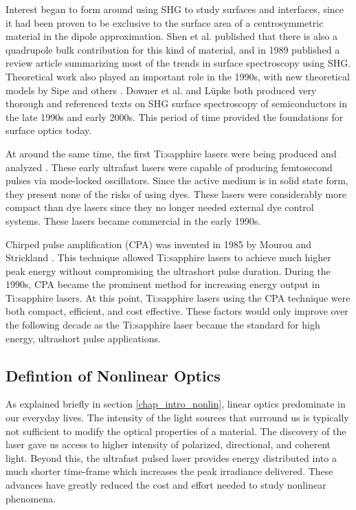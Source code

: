 \documentclass[10pt]{article}
\begin{document}
Interest began to form around using SHG to study surfaces and interfaces, since it had been proven \cite{PhysRevLett.46.145} to be exclusive to the surface area of a centrosymmetric material in the dipole approximation. Shen et al. published \cite{PhysRevB.38.7985} that there is also a quadrupole bulk contribution for this kind of material, and in 1989 \cite{shen89nature} published a review article summarizing most of the trends in surface spectroscopy using SHG. Theoretical work also played an important role in the 1990s, with new theoretical models by Sipe \cite{PhysRevB.53.10751} and others \cite{PhysRevB.53.4999, PhysRevB.60.14334, PhysRevB.55.2489, PhysRevB.57.2569}. Downer et al. \cite{downer2001optical} and L\"upke \cite{Lupke199975} both produced very thorough and referenced texts on SHG surface spectroscopy of semiconductors in the late 1990s and early 2000s. This period of time provided the foundations for surface optics today.

At around the same time, the first Ti:sapphire lasers were being produced and analyzed \cite{Moulton:86}. These early ultrafast lasers were capable of producing femtosecond pulses via mode-locked oscillators. Since the active medium is in solid state form, they present none of the risks of using dyes. These lasers were considerably more compact than dye lasers since they no longer needed external dye control systems. These lasers became commercial in the early 1990s.

Chirped pulse amplification (CPA) was invented in 1985 by Mourou and Strickland \cite{Strickland1985447}. This technique allowed Ti:sapphire lasers to achieve much higher peak energy without compromising the ultrashort pulse duration. During the 1990s, CPA became the prominent method for increasing energy output in Ti:sapphire lasers. At this point, Ti:sapphire lasers using the CPA technique were both compact, efficient, and cost effective. These factors would only improve over the following decade as the Ti:sapphire laser became the standard for high energy, ultrashort pulse applications.

\subsection{Defintion of Nonlinear Optics}
As explained briefly in section \ref{chap_intro_nonlin}, linear optics predominate in our everyday lives. The intensity of the light sources that surround us is typically not sufficient to modify the optical properties of a material. The discovery of the laser gave us access to higher intensity of polarized, directional, and coherent light. Beyond this, the ultrafast pulsed laser provides energy distributed into a much shorter time-frame which increases the peak irradiance delivered. These advances have greatly reduced the cost and effort needed to study nonlinear phenomena.
\end{document}
